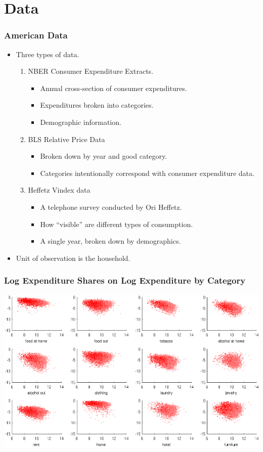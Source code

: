 \documentclass{beamer}
\begin{document}
 \section{Data}
 \begin{frame}[label=hefback]
	\frametitle{American Data}
	\begin{itemize} 
	  \item Three types of data.
	    \begin{enumerate}
	      \item NBER Consumer Expenditure Extracts.
		\begin{itemize}
		  \item Annual cross-section of consumer expenditures.
		  \item Expenditures broken into categories.
		  \item Demographic information.
		\end{itemize} 
	      \item BLS Relative Price Data
		\begin{itemize}
		  \item Broken down by year and good category.
		  \item Categories intentionally correspond with consumer expenditure data.
		\end{itemize}
	      \item Heffetz Vindex data
		\begin{itemize}
		  \item A telephone survey conducted by Ori Heffetz.
		  \item How ``visible'' are different types of consumption. 
		    
		    \hyperlink{survq}{}
		  \item A single year, broken down by demographics.  
		\end{itemize}
	    \end{enumerate}
	  \item Unit of observation is the household.
	\end{itemize}
 \end{frame}
 \begin{frame}
   \frametitle{Log Expenditure Shares on Log Expenditure by Category}
   \includegraphics[scale = .70]{pics/shares_cropped_cropped.pdf}
 \end{frame}
\end{document}
